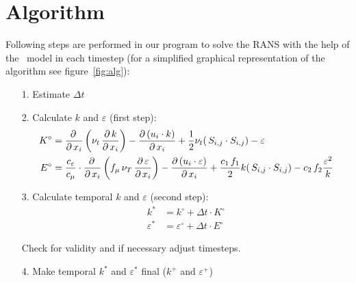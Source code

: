 \section*{Algorithm}
Following steps are performed in our program to solve the RANS with the help of the \ke\, model in each timestep (for a simplified graphical representation of the algorithm see figure~\ref{fig:alg}):
\begin{itemize}
\item[1.] Estimate $\Delta t$
\item[2.] Calculate $k$ and $\varepsilon$ (first step):
\begin{align}\label{KK1}
K^\circ&=
\frac{\partial\,}{\partial\,x_i}\left(\nu_t\,\frac{\partial\,k}{\partial\,x_i}\right)
-
\frac{\partial\,(u_i\cdot k)}{\partial\,x_i}
+
\frac{1}{2}\nu_t
(\,S_{i,j} \cdot S_{i,j})
-
\varepsilon
\\\label{EE1}
E^\circ&=\frac{c_\varepsilon}{c_\mu}\cdot
\frac{\partial\,}{\partial\,x_i}\left(f_\mu\,\nu_T\,\frac{\partial\,\varepsilon}{\partial\,x_i}\right)
-
\frac{\partial\,(u_i\cdot \varepsilon)}{\partial\,x_i}
+
\frac{c_1\,f_1}{2}k
(\,S_{i,j} \cdot S_{i,j})
-
c_2\,f_2\frac{\varepsilon^2}{k}
\end{align}\vspace{-0.5cm}



\item[3.] Calculate temporal $k$ and $\varepsilon$ (second step):
\begin{align}
k^* &= k^\circ + \Delta t \cdot K^\circ\\
\varepsilon^* &= \varepsilon^\circ + \Delta t \cdot E^\circ
\end{align}\vspace{-0.5cm}

Check for validity and if necessary adjust timesteps.

\item[4.] Make temporal $k^*$ and $\varepsilon^*$ final ($k^+$ and $\varepsilon^+$)


\end{itemize}
